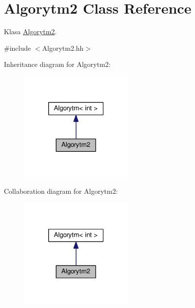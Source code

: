 \hypertarget{a00003}{}\section{Algorytm2 Class Reference}
\label{a00003}


Klasa \hyperlink{a00003}{Algorytm2}.  




{\ttfamily \#include $<$Algorytm2.\+hh$>$}



Inheritance diagram for Algorytm2\+:
\nopagebreak
\begin{figure}[H]
\begin{center}
\leavevmode
\includegraphics[width=162pt]{a00107}
\end{center}
\end{figure}


Collaboration diagram for Algorytm2\+:
\nopagebreak
\begin{figure}[H]
\begin{center}
\leavevmode
\includegraphics[width=162pt]{a00108}
\end{center}
\end{figure}
